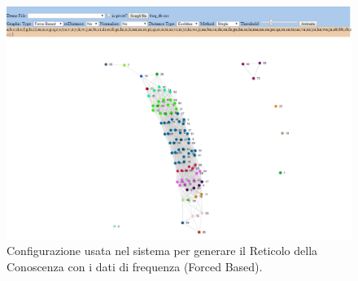 \noindent
\begin{figure}[H]
\centering
	\includegraphics[width=1\linewidth]{./image/Reticolo_db-frequenza-3.png}
	\caption{Configurazione usata nel sistema per generare il Reticolo della Conoscenza con i dati di frequenza (Forced Based).}
	\label{Configurazione usata nel sistema per generare il Reticolo della Conoscenza con i dati di frequenza (Forced Based).}
\end{figure}
\noindent





